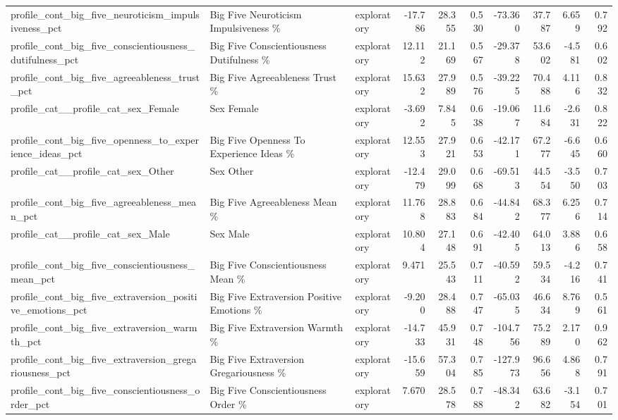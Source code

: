 \begin{table}[htbp]
\begin{threeparttable}
\begin{tabular}{lllrrrrrrr}
profile\_cont\_big\_five\_neuroticism\_impulsiveness\_pct & Big Five Neuroticism Impulsiveness \% & exploratory & -17.786 & 28.355 & 0.530 & -73.360 & 37.787 & 6.659 & 0.792 \\
profile\_cont\_big\_five\_conscientiousness\_dutifulness\_pct & Big Five Conscientiousness Dutifulness \% & exploratory & 12.112 & 21.169 & 0.567 & -29.378 & 53.602 & -4.581 & 0.602 \\
profile\_cont\_big\_five\_agreeableness\_trust\_pct & Big Five Agreeableness Trust \% & exploratory & 15.632 & 27.989 & 0.576 & -39.225 & 70.488 & 4.116 & 0.832 \\
profile\_cat\_\_profile\_cat\_sex\_Female & Sex Female & exploratory & -3.692 & 7.845 & 0.638 & -19.067 & 11.684 & -2.631 & 0.822 \\
profile\_cont\_big\_five\_openness\_to\_experience\_ideas\_pct & Big Five Openness To Experience Ideas \% & exploratory & 12.553 & 27.921 & 0.653 & -42.171 & 67.277 & -6.645 & 0.660 \\
profile\_cat\_\_profile\_cat\_sex\_Other & Sex Other & exploratory & -12.479 & 29.099 & 0.668 & -69.513 & 44.554 & -3.550 & 0.703 \\
profile\_cont\_big\_five\_agreeableness\_mean\_pct & Big Five Agreeableness Mean \% & exploratory & 11.768 & 28.883 & 0.684 & -44.842 & 68.377 & 6.256 & 0.714 \\
profile\_cat\_\_profile\_cat\_sex\_Male & Sex Male & exploratory & 10.804 & 27.148 & 0.691 & -42.405 & 64.013 & 3.886 & 0.658 \\
profile\_cont\_big\_five\_conscientiousness\_mean\_pct & Big Five Conscientiousness Mean \% & exploratory & 9.471 & 25.543 & 0.711 & -40.592 & 59.534 & -4.216 & 0.741 \\
profile\_cont\_big\_five\_extraversion\_positive\_emotions\_pct & Big Five Extraversion Positive Emotions \% & exploratory & -9.200 & 28.488 & 0.747 & -65.035 & 46.634 & 8.769 & 0.561 \\
profile\_cont\_big\_five\_extraversion\_warmth\_pct & Big Five Extraversion Warmth \% & exploratory & -14.733 & 45.931 & 0.748 & -104.756 & 75.289 & 2.170 & 0.962 \\
profile\_cont\_big\_five\_extraversion\_gregariousness\_pct & Big Five Extraversion Gregariousness \% & exploratory & -15.659 & 57.304 & 0.785 & -127.973 & 96.656 & 4.868 & 0.791 \\
profile\_cont\_big\_five\_conscientiousness\_order\_pct & Big Five Conscientiousness Order \% & exploratory & 7.670 & 28.578 & 0.788 & -48.342 & 63.682 & -3.154 & 0.701 \\

\end{tabular}
\end{threeparttable}
\end{table}
